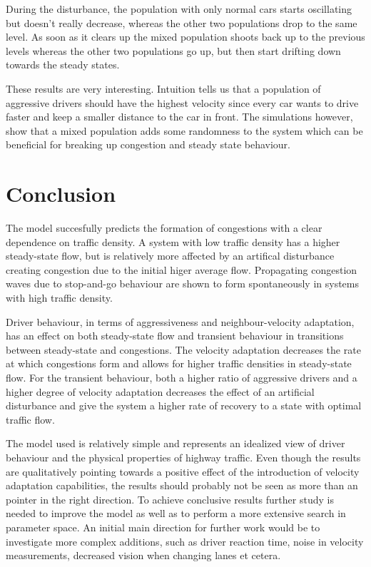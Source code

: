 \documentclass[11pt,a4paper,twocolumn]{article}
\begin{document}
During the disturbance, the population with only normal cars starts oscillating but doesn't really decrease, whereas the other two populations drop to the same level. As soon as it clears up the mixed population shoots back up to the previous levels whereas the other two populations go up, but then start drifting down towards the steady states.

These results are very interesting. Intuition tells us that a population of aggressive drivers should have the highest velocity since every car wants to drive faster and keep a smaller distance to the car in front. The simulations however, show that a mixed population adds some randomness to the system which can be beneficial for breaking up congestion and steady state behaviour.

\section{Conclusion}
The model succesfully predicts the formation of congestions with a clear dependence on traffic density. A system with low traffic density has a higher steady-state flow, but is relatively more affected by an artifical disturbance creating congestion due to the initial higer average flow. Propagating congestion waves due to stop-and-go behaviour are shown to form spontaneously in systems with high traffic density. 

Driver behaviour, in terms of aggressiveness and neighbour-velocity adaptation, has an effect on both steady-state flow and transient behaviour in transitions between steady-state and congestions. The velocity adaptation decreases the rate at which congestions form and allows for higher traffic densities in steady-state flow. For the transient behaviour, both a higher ratio of aggressive drivers and a higher degree of velocity adaptation decreases the effect of an artificial disturbance and give the system a higher rate of recovery to a state with optimal traffic flow.

The model used is relatively simple and represents an idealized view of driver behaviour and the physical properties of highway traffic. Even though the results are qualitatively pointing towards a positive effect of the introduction of velocity adaptation capabilities, the results should probably not be seen as more than an pointer in the right direction. To achieve conclusive results further study is needed to improve the model as well as to perform a more extensive search in parameter space. An initial main direction for further work would be to investigate more complex additions, such as driver reaction time, noise in velocity measurements, decreased vision when changing lanes et cetera.
\end{document}
